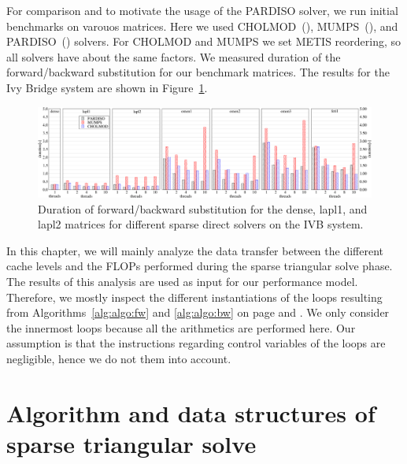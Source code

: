 For comparison and to motivate the usage of the PARDISO solver, we run initial benchmarks on varouos matrices. Here we used CHOLMOD~(\cite{cholmod2008,doi:10.1137/1.9780898718881}), MUMPS~(\cite{amestoy-2000,amestoy-2001,amestoy-2006}), and PARDISO~(\cite{schenk-2004,kuzmin-2013}) solvers. For CHOLMOD and MUMPS we set METIS reordering, so all solvers have about the same factors. We measured duration of the forward/backward substitution for our benchmark
matrices. The results for the Ivy Bridge system are shown in Figure~\ref{fig:solvers}.

%
\begin{figure}[tp]
  \centering
	\includegraphics[width=\textwidth,clip=true]{images/SolverComparison}
   \caption{Duration of forward/backward substitution for the dense, lapl1, and lapl2 matrices for different sparse direct solvers on the IVB system.}
  \label{fig:solvers}
\end{figure}

In this chapter, we will mainly analyze the data transfer between the different cache levels and the FLOPs performed during the sparse triangular solve phase. The results of this analysis are used as input for our performance model. Therefore, we mostly inspect the different instantiations of the loops resulting from Algorithms~\ref{alg:algo:fw} and \ref{alg:algo:bw} on page \pageref{alg:algo:fw} and \pageref{alg:algo:bw}. We only consider the innermost loops because all the arithmetics are performed here. Our assumption is that the instructions regarding control variables of the loops are negligible, hence we do not them into account.

\section{Algorithm and data structures of sparse triangular solve}

